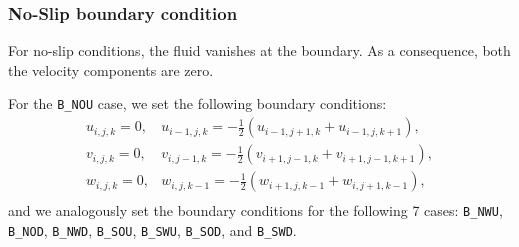 \documentclass[a4paper, 12pt]{article}
\begin{document}
\subsubsection{No-Slip boundary condition}\label{sec:no-slip}
For no-slip conditions, the fluid vanishes at the boundary. As a consequence, both the velocity components are zero. 

%

For the \texttt{B\_NOU} case, we set the following boundary conditions:
\begin{equation}
\begin{array}{ll}
u_{i,j,k} = 0, & u_{i-1,j,k} = -\frac{1}{2}(u_{i-1,j+1,k}+u_{i-1,j,k+1}), \\
v_{i,j,k} = 0, & v_{i,j-1,k} = -\frac{1}{2}(v_{i+1,j-1,k}+v_{i+1,j-1,k+1}), \\
w_{i,j,k} = 0, & w_{i,j,k-1} = -\frac{1}{2}(w_{i+1,j,k-1}+w_{i,j+1,k-1}), \\
\end{array}
\end{equation}
and we analogously set the boundary conditions for the following 7 cases: \texttt{B\_NWU}, \texttt{B\_NOD}, \texttt{B\_NWD}, \texttt{B\_SOU}, \texttt{B\_SWU}, \texttt{B\_SOD}, and \texttt{B\_SWD}.
\end{document}

